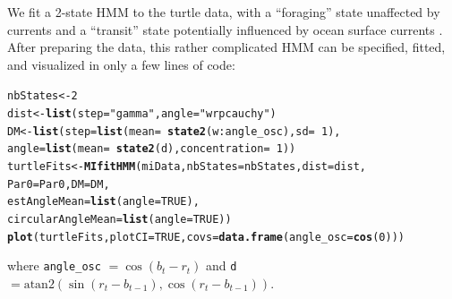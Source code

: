 \documentclass[12pt]{article}\usepackage[]{graphicx}\usepackage[]{color}
\makeatletter
\newcommand{\hlnum}[1]{\textcolor[rgb]{0.686,0.059,0.569}{#1}}%
\newcommand{\hlstr}[1]{\textcolor[rgb]{0.192,0.494,0.8}{#1}}%
\newcommand{\hlopt}[1]{\textcolor[rgb]{0,0,0}{#1}}%
\newcommand{\hlstd}[1]{\textcolor[rgb]{0.345,0.345,0.345}{#1}}%
\newcommand{\hlkwb}[1]{\textcolor[rgb]{0.69,0.353,0.396}{#1}}%
\newcommand{\hlkwc}[1]{\textcolor[rgb]{0.333,0.667,0.333}{#1}}%
\newcommand{\hlkwd}[1]{\textcolor[rgb]{0.737,0.353,0.396}{\textbf{#1}}}%
\newenvironment{kframe}{%
 \def\at@end@of@kframe{}%
 \ifinner\ifhmode%
  \def\at@end@of@kframe{\end{minipage}}%
  \begin{minipage}{\columnwidth}%
 \fi\fi%
 \def\FrameCommand##1{\hskip\@totalleftmargin \hskip-\fboxsep
 \colorbox{shadecolor}{##1}\hskip-\fboxsep
     \hskip-\linewidth \hskip-\@totalleftmargin \hskip\columnwidth}%
 \MakeFramed {\advance\hsize-\width
   \@totalleftmargin\z@ \linewidth\hsize
   \@setminipage}}%
 {\par\unskip\endMakeFramed%
 \at@end@of@kframe}
\newenvironment{knitrout}{}{} %
\makeatother
\begin{document}
We fit a 2-state HMM to the turtle data, with a ``foraging'' state unaffected by currents and a ``transit'' state potentially influenced by ocean surface currents%
. After preparing the data, this rather complicated HMM can be specified, fitted, and visualized in only a few lines of code:
\begin{knitrout}
\color{fgcolor}\begin{kframe}
\begin{alltt}
\hlstd{nbStates} \hlkwb{<-} \hlnum{2}
\hlstd{dist} \hlkwb{<-} \hlkwd{list}\hlstd{(}\hlkwc{step} \hlstd{=} \hlstr{"gamma"}\hlstd{,} \hlkwc{angle} \hlstd{=} \hlstr{"wrpcauchy"}\hlstd{)}
\hlstd{DM} \hlkwb{<-} \hlkwd{list}\hlstd{(}\hlkwc{step} \hlstd{=} \hlkwd{list}\hlstd{(}\hlkwc{mean} \hlstd{=} \hlopt{~}\hlkwd{state2}\hlstd{(w}\hlopt{:}\hlstd{angle_osc),} \hlkwc{sd} \hlstd{=} \hlopt{~}\hlnum{1}\hlstd{),}
           \hlkwc{angle} \hlstd{=} \hlkwd{list}\hlstd{(}\hlkwc{mean} \hlstd{=} \hlopt{~}\hlkwd{state2}\hlstd{(d),} \hlkwc{concentration}\hlstd{=} \hlopt{~}\hlnum{1}\hlstd{))}
\hlstd{turtleFits} \hlkwb{<-} \hlkwd{MIfitHMM}\hlstd{(miData,} \hlkwc{nbStates} \hlstd{= nbStates,} \hlkwc{dist} \hlstd{= dist,}
                       \hlkwc{Par0} \hlstd{= Par0,} \hlkwc{DM} \hlstd{= DM,}
                       \hlkwc{estAngleMean} \hlstd{=} \hlkwd{list}\hlstd{(}\hlkwc{angle} \hlstd{=} \hlnum{TRUE}\hlstd{),}
                       \hlkwc{circularAngleMean} \hlstd{=} \hlkwd{list}\hlstd{(}\hlkwc{angle} \hlstd{=} \hlnum{TRUE}\hlstd{))}
\hlkwd{plot}\hlstd{(turtleFits,} \hlkwc{plotCI} \hlstd{=} \hlnum{TRUE}\hlstd{,} \hlkwc{covs} \hlstd{=} \hlkwd{data.frame}\hlstd{(}\hlkwc{angle_osc} \hlstd{=} \hlkwd{cos}\hlstd{(}\hlnum{0}\hlstd{)))}
\end{alltt}
\end{kframe}
\end{knitrout}
\noindent where \verb|angle_osc| $=\cos(b_t-r_t)$ and \verb|d| $=\text{atan2}(\sin(r_t-b_{t-1}),\cos(r_t-b_{t-1}))$.%
\end{document}
